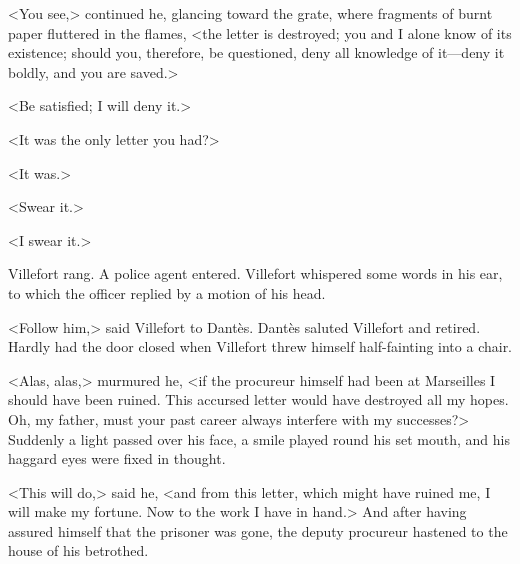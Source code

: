  <You see,> continued he, glancing toward the grate, where fragments of burnt paper fluttered in the flames, <the letter is destroyed; you and I alone know of its existence; should you, therefore, be questioned, deny all knowledge of it—deny it boldly, and you are saved.> 

 <Be satisfied; I will deny it.> 

 <It was the only letter you had?> 

 <It was.> 

 <Swear it.> 

 <I swear it.> 

 Villefort rang. A police agent entered. Villefort whispered some words in his ear, to which the officer replied by a motion of his head. 

 <Follow him,> said Villefort to Dantès. Dantès saluted Villefort and retired. Hardly had the door closed when Villefort threw himself half-fainting into a chair. 

 <Alas, alas,> murmured he, <if the procureur himself had been at Marseilles I should have been ruined. This accursed letter would have destroyed all my hopes. Oh, my father, must your past career always interfere with my successes?> Suddenly a light passed over his face, a smile played round his set mouth, and his haggard eyes were fixed in thought. 

 <This will do,> said he, <and from this letter, which might have ruined me, I will make my fortune. Now to the work I have in hand.> And after having assured himself that the prisoner was gone, the deputy procureur hastened to the house of his betrothed.